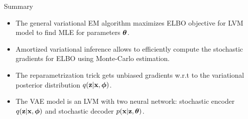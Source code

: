 \begin{frame}{Summary}
	\begin{itemize}
		\item The general variational EM algorithm maximizes ELBO objective for LVM model to find MLE for parameters $\boldsymbol{\theta}$.
		\vfill
		\item Amortized variational inference allows to efficiently compute the stochastic gradients for ELBO using Monte-Carlo estimation.
		\vfill
		\item The reparametrization trick gets unbiased gradients w.r.t to the variational posterior distribution $q(\mathbf{z} | \mathbf{x}, \boldsymbol{\phi})$.
		\vfill
		\item The VAE model is an LVM with two neural network: stochastic encoder $q(\mathbf{z} | \mathbf{x}, \boldsymbol{\phi})$ and stochastic decoder $p(\mathbf{x} | \mathbf{z}, \boldsymbol{\theta})$.
	\end{itemize}
\end{frame}
 